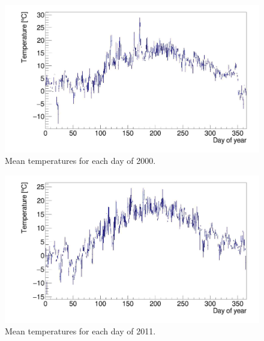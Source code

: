 \begin{figure}
    \centering
    \includegraphics[width=14cm]{eachday2000.jpg}
    \caption{Mean temperatures for each day of 2000.}
    \label{2000}
\end{figure}

\begin{figure}
    \centering
    \includegraphics[width=14cm]{eachday2011.jpg}
    \caption{Mean temperatures for each day of 2011.}
    \label{2011}
\end{figure}
